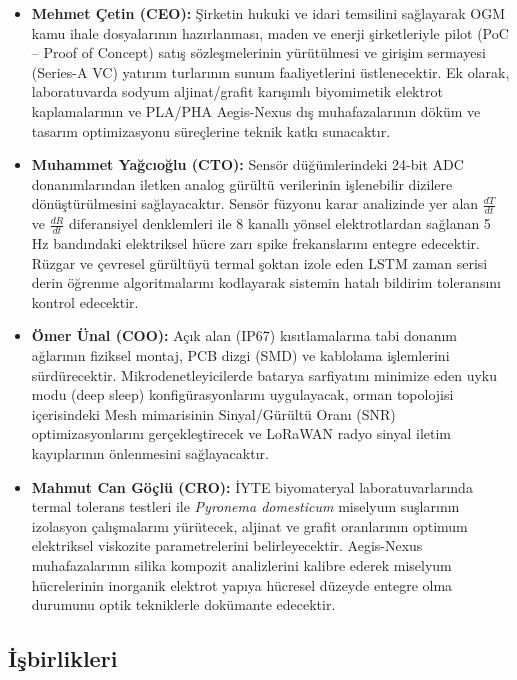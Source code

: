 \documentclass[11pt,a4paper]{article}
\begin{document}
\begin{itemize}[leftmargin=1cm]
  \item \textbf{Mehmet Çetin (CEO):} Şirketin hukuki ve idari temsilini sağlayarak OGM kamu ihale dosyalarının hazırlanması, maden ve enerji şirketleriyle pilot (PoC -- Proof of Concept) satış sözleşmelerinin yürütülmesi ve girişim sermayesi (Series-A VC) yatırım turlarının sunum faaliyetlerini üstlenecektir. Ek olarak, laboratuvarda sodyum aljinat/grafit karışımlı biyomimetik elektrot kaplamalarının ve PLA/PHA Aegis-Nexus dış muhafazalarının döküm ve tasarım optimizasyonu süreçlerine teknik katkı sunacaktır.
  \item \textbf{Muhammet Yağcıoğlu (CTO):} Sensör düğümlerindeki 24-bit ADC donanımlarından iletken analog gürültü verilerinin işlenebilir dizilere dönüştürülmesini sağlayacaktır. Sensör füzyonu karar analizinde yer alan $\frac{dT}{dt}$ ve $\frac{dR}{dt}$ diferansiyel denklemleri ile 8 kanallı yönsel elektrotlardan sağlanan 5 Hz bandındaki elektriksel hücre zarı spike frekanslarını entegre edecektir. Rüzgar ve çevresel gürültüyü termal şoktan izole eden LSTM zaman serisi derin öğrenme algoritmalarını kodlayarak sistemin hatalı bildirim toleransını kontrol edecektir.
  \item \textbf{Ömer Ünal (COO):} Açık alan (IP67) kısıtlamalarına tabi donanım ağlarının fiziksel montaj, PCB dizgi (SMD) ve kablolama işlemlerini sürdürecektir. Mikrodenetleyicilerde batarya sarfiyatını minimize eden uyku modu (deep sleep) konfigürasyonlarını uygulayacak, orman topolojisi içerisindeki Mesh mimarisinin Sinyal/Gürültü Oranı (SNR) optimizasyonlarını gerçekleştirecek ve LoRaWAN radyo sinyal iletim kayıplarının önlenmesini sağlayacaktır.
  \item \textbf{Mahmut Can Göçlü (CRO):} İYTE biyomateryal laboratuvarlarında termal tolerans testleri ile \textit{Pyronema domesticum} miselyum suşlarının izolasyon çalışmalarını yürütecek, aljinat ve grafit oranlarının optimum elektriksel viskozite parametrelerini belirleyecektir. Aegis-Nexus muhafazalarının silika kompozit analizlerini kalibre ederek miselyum hücrelerinin inorganik elektrot yapıya hücresel düzeyde entegre olma durumunu optik tekniklerle dokümante edecektir.
\end{itemize}

\subsection{İşbirlikleri}
\end{document}

